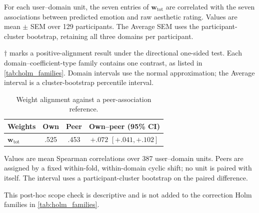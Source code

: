 \documentclass[10pt,twocolumn,letterpaper]{article}
\begin{document}
\begin{table}[!tbp]
\centering
\begin{minipage}[t]{0.48\textwidth}
\centering
\begin{threeparttable}
\caption{Alignment between each fitted total emotion-space weight vector and
the corresponding user's empirical emotion--rating associations.}
\label{tab:weight_alignment}
\small

\begin{tablenotes}[flushleft]\footnotesize
    \item For each user--domain unit, the seven entries of $\mathbf w_{\mathrm{tot}}$
    are correlated with the seven associations between predicted emotion and raw
    aesthetic rating. Values are mean $\pm$ SEM over 129 participants. The Average
    SEM uses the participant-cluster bootstrap, retaining all three domains per
    participant.
    \item $\dagger$ marks a positive-alignment result under the directional
    one-sided test. Each domain--coefficient-type family contains one contrast, as
    listed in \cref{tab:holm_families}. Domain intervals use the normal
    approximation; the Average interval is a cluster-bootstrap percentile interval.
\end{tablenotes}
\end{threeparttable}
\end{minipage}
\hfill
\begin{minipage}[t]{0.48\textwidth}
\centering
\begin{threeparttable}
\caption{Weight alignment against a peer-association reference.}
\label{tab:weight_alignment_peer}
\small
\setlength{\tabcolsep}{4pt}
    \begin{tabular}{lccc}
    \toprule
    Weights & Own & Peer & Own--peer (95\% CI) \\
    \midrule
    $\mathbf w_{\mathrm{tot}}$ & .525 & .453 & $+.072$ $[+.041,+.102]$ \\
    \bottomrule
    \end{tabular}
\begin{tablenotes}[flushleft]\footnotesize
    \item Values are mean Spearman correlations over 387 user--domain units.
    Peers are assigned by a fixed within-fold, within-domain cyclic shift; no
    unit is paired with itself. The interval uses a participant-cluster
    bootstrap on the paired difference.
    \item This post-hoc scope check is descriptive and is not added to the correction Holm families in \cref{tab:holm_families}.
\end{tablenotes}
\end{threeparttable}
\end{minipage}
\end{table}
\end{document}
